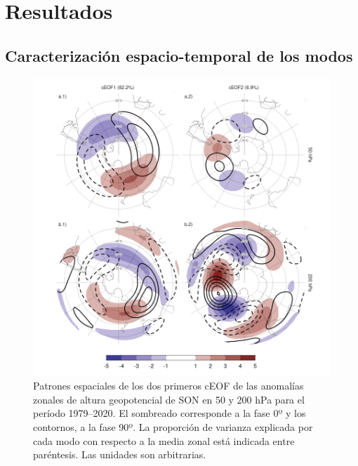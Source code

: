 \documentclass[12pt,oneside,a4paper]{reedthesis}
\begin{document}
\hypertarget{resultados-1}{%
\section{Resultados}\label{resultados-1}}

\hypertarget{caracterizaciuxf3n-espacio-temporal-de-los-modos}{%
\subsection{Caracterización espacio-temporal de los modos}\label{caracterizaciuxf3n-espacio-temporal-de-los-modos}}



\begin{figure}

{\centering \includegraphics{figures/20-ceofs/ceofs-1-1} 

}

\caption{Patrones espaciales de los dos primeros cEOF de las anomalías zonales de altura geopotencial de SON en 50 y 200 hPa para el período 1979--2020. El sombreado corresponde a la fase 0º y los contornos, a la fase 90º. La proporción de varianza explicada por cada modo con respecto a la media zonal está indicada entre paréntesis. Las unidades son arbitrarias.}\label{fig:ceofs-1}
\end{figure}
\end{document}
